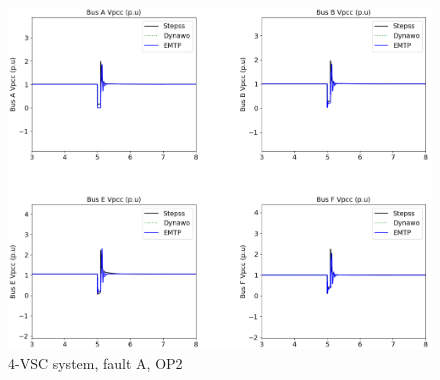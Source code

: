 \documentclass{report}
\begin{document}
\begin{figure}[H]
    \centering
    \includegraphics[width = \columnwidth]{Figure_4VSC/4VSC_OP2_fault.png}
    \caption{4-VSC system, fault A, OP2}
    \label{fig:4VSC_fault_OP2}
\end{figure}
\end{document}
